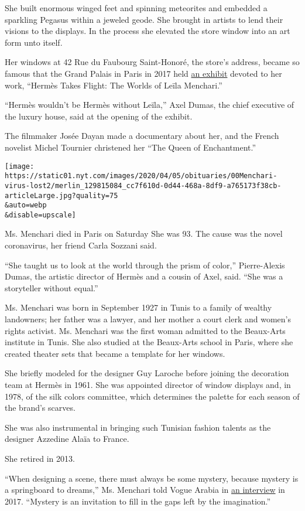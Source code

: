 She built enormous winged feet and spinning meteorites and embedded a
sparkling Pegasus within a jeweled geode. She brought in artists to lend
their visions to the displays. In the process she elevated the store
window into an art form unto itself.

Her windows at 42 Rue du Faubourg Saint-Honoré, the store's address,
became so famous that the Grand Palais in Paris in 2017 held
\href{https://www.nytimes.com/2017/11/10/style/hermes-windows-grand-palais-leila-menchari.html}{an
exhibit} devoted to her work, ``Hermès Takes Flight: The Worlds of Leïla
Menchari.''

``Hermès wouldn't be Hermès without Leïla,'' Axel Dumas, the chief
executive of the luxury house, said at the opening of the exhibit.

The filmmaker Josée Dayan made a documentary about her, and the French
novelist Michel Tournier christened her ``The Queen of Enchantment.''

\texttt{[image: https://static01.nyt.com/images/2020/04/05/obituaries/00Menchari-virus-lost2/merlin\_129815084\_cc7f610d-0d44-468a-8df9-a765173f38cb-articleLarge.jpg?quality=75\\\&auto=webp\\\&disable=upscale]}

Ms. Menchari died in Paris on Saturday She was 93. The cause was the
novel coronavirus, her friend Carla Sozzani said.

``She taught us to look at the world through the prism of color,''
Pierre-Alexis Dumas, the artistic director of Hermès and a cousin of
Axel, said. ``She was a storyteller without equal.''

Ms. Menchari was born in September 1927 in Tunis to a family of wealthy
landowners; her father was a lawyer, and her mother a court clerk and
women's rights activist. Ms. Menchari was the first woman admitted to
the Beaux-Arts institute in Tunis. She also studied at the Beaux-Arts
school in Paris, where she created theater sets that became a template
for her windows.

She briefly modeled for the designer Guy Laroche before joining the
decoration team at Hermès in 1961. She was appointed director of window
displays and, in 1978, of the silk colors committee, which determines
the palette for each season of the brand's scarves.

She was also instrumental in bringing such Tunisian fashion talents as
the designer Azzedine Alaïa to France.

She retired in 2013.

``When designing a scene, there must always be some mystery, because
mystery is a springboard to dreams,'' Ms. Menchari told Vogue Arabia in
\href{https://en.vogue.me/culture/remembering-hermes-leila-menchari/}{an
interview} in 2017. ``Mystery is an invitation to fill in the gaps left
by the imagination.''


